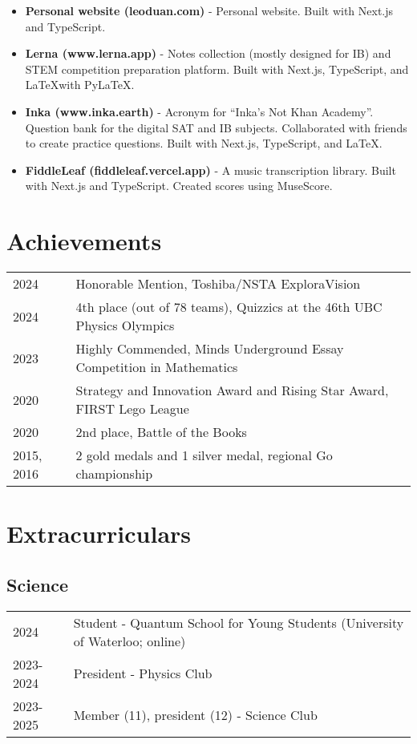 \documentclass{article}
\begin{document}
\begin{itemize}
	\item \textbf{Personal website (leoduan.com)} - Personal website. Built with Next.js and TypeScript.
	\item \textbf{Lerna (www.lerna.app)} - Notes collection (mostly designed for IB) and STEM competition preparation platform. Built with Next.js, TypeScript, and \LaTeX with PyLaTeX.
	\item \textbf{Inka (www.inka.earth)} - Acronym for ``Inka's Not Khan Academy''. Question bank for the digital SAT and IB subjects. Collaborated with friends to create practice questions. Built with Next.js, TypeScript, and \LaTeX.
	\item \textbf{FiddleLeaf (fiddleleaf.vercel.app)} - A music transcription library. Built with Next.js and TypeScript. Created scores using MuseScore.
\end{itemize}

\section*{Achievements}

\begin{tabular}{@{}ll}
	2024       & Honorable Mention, Toshiba/NSTA ExploraVision                          \\
	2024       & 4th place (out of 78 teams), Quizzics at the 46th UBC Physics Olympics \\
	2023       & Highly Commended, Minds Underground Essay Competition in Mathematics   \\
	2020       & Strategy and Innovation Award and Rising Star Award, FIRST Lego League \\
	2020       & 2nd place, Battle of the Books                                         \\
	2015, 2016 & 2 gold medals and 1 silver medal, regional Go championship
\end{tabular}

\section*{Extracurriculars}

\subsection*{Science}

\begin{tabular}{@{}ll}
	2024      & Student - Quantum School for Young Students (University of Waterloo; online) \\
	2023-2024 & President - Physics Club                                                     \\
	2023-2025 & Member (11), president (12) - Science Club
\end{tabular}
\end{document}
